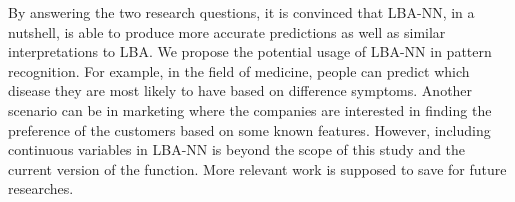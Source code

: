 \documentclass[]{interact}
\theoremstyle{plain}%
\theoremstyle{definition}
\theoremstyle{remark}
\begin{document}
By answering the two research questions, it is convinced that LBA-NN, in
a nutshell, is able to produce more accurate predictions as well as
similar interpretations to LBA. We propose the potential usage of LBA-NN
in pattern recognition. For example, in the field of medicine, people
can predict which disease they are most likely to have based on
difference symptoms. Another scenario can be in marketing where the
companies are interested in finding the preference of the customers
based on some known features. However, including continuous variables in
LBA-NN is beyond the scope of this study and the current version of the
function. More relevant work is supposed to save for future researches.



\end{document}
